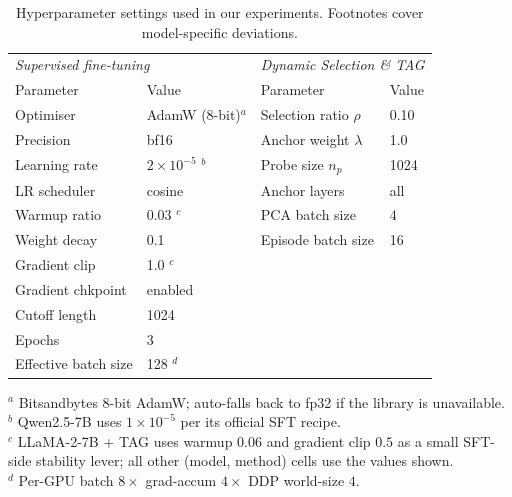 \vspace{-0.4em}
\begin{table}[h]
\centering
\caption{Hyperparameter settings used in our experiments.
Footnotes cover model-specific deviations.}
\label{tab:hyperparams}
\small
\setlength{\tabcolsep}{4pt}
\begin{tabular}{ll@{\hspace{1em}}ll}
\toprule
\multicolumn{2}{l}{\emph{Supervised fine-tuning}} &
\multicolumn{2}{l}{\emph{Dynamic Selection \& TAG}} \\
Parameter & Value & Parameter & Value \\
\midrule
Optimiser            & AdamW (8-bit)$^{a}$        & Selection ratio $\rho$  & 0.10 \\
Precision            & bf16                       & Anchor weight $\lambda$ & 1.0  \\
Learning rate        & $2\times10^{-5}$ $^{b}$    & Probe size $n_p$        & 1024 \\
LR scheduler         & cosine                     & Anchor layers           & all  \\
Warmup ratio         & 0.03 $^{c}$                & PCA batch size          & 4    \\
Weight decay         & 0.1                        & Episode batch size      & 16   \\
Gradient clip        & 1.0 $^{c}$                 &                         &      \\
Gradient chkpoint  & enabled                    &                         &      \\
Cutoff length        & 1024                       &                         &      \\
Epochs               & 3                          &                         &      \\
Effective batch size & 128 $^{d}$                 &                         &      \\
\bottomrule
\end{tabular}

\smallskip
\begin{flushleft}
\tiny
$^{a}$ Bitsandbytes 8-bit AdamW; auto-falls back to fp32 if the library is unavailable.\\
$^{b}$ Qwen2.5-7B uses $1\times10^{-5}$ per its official SFT recipe.\\
$^{c}$ LLaMA-2-7B + TAG uses warmup $0.06$ and gradient clip $0.5$ as a small SFT-side stability lever; all other (model, method) cells use the values shown.\\
$^{d}$ Per-GPU batch $8\times$ grad-accum $4\times$ DDP world-size $4$.
\end{flushleft}
\end{table}

